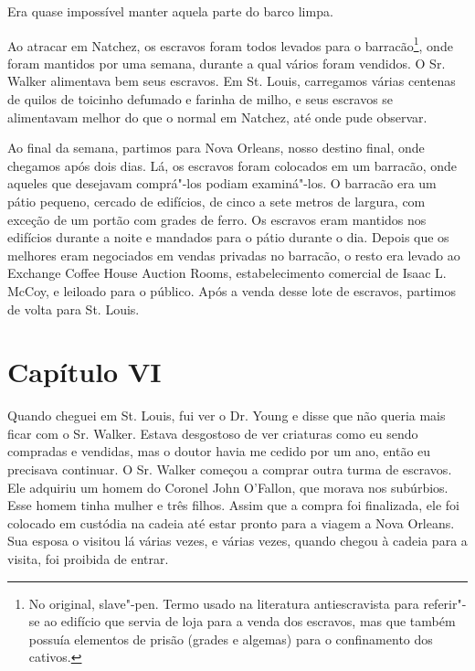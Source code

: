 Era quase impossível manter aquela parte do barco limpa.

Ao atracar em Natchez, os escravos foram todos levados para o
barracão\footnote{No original, slave"-pen. Termo usado na literatura
  antiescravista para referir"-se ao edifício que servia de loja para a
  venda dos escravos, mas que também possuía elementos de prisão (grades
  e algemas) para o confinamento dos cativos.}, onde foram mantidos por
uma semana, durante a qual vários foram vendidos. O Sr. Walker
alimentava bem seus escravos. Em St. Louis, carregamos várias centenas
de quilos de toicinho defumado e farinha de milho, e seus escravos se
alimentavam melhor do que o normal em Natchez, até onde pude observar.

Ao final da semana, partimos para Nova Orleans, nosso destino final,
onde chegamos após dois dias. Lá, os escravos foram colocados em um
barracão, onde aqueles que desejavam comprá"-los podiam examiná"-los. O
barracão era um pátio pequeno, cercado de edifícios, de cinco a sete
metros de largura, com exceção de um portão com grades de ferro. Os
escravos eram mantidos nos edifícios durante a noite e mandados para o
pátio durante o dia. Depois que os melhores eram negociados em vendas
privadas no barracão, o resto era levado ao Exchange Coffee House
Auction Rooms, estabelecimento comercial de Isaac L. McCoy, e leiloado
para o público. Após a venda desse lote de escravos, partimos de volta
para St. Louis.

\chapter{Capítulo VI}

Quando cheguei em St. Louis, fui ver o Dr. Young e disse que não queria
mais ficar com o Sr. Walker. Estava desgostoso de ver criaturas como eu
sendo compradas e vendidas, mas o doutor havia me cedido por um ano,
então eu precisava continuar. O Sr. Walker começou a comprar outra turma
de escravos. Ele adquiriu um homem do Coronel John O'Fallon, que morava
nos subúrbios. Esse homem tinha mulher e três filhos. Assim que a compra
foi finalizada, ele foi colocado em custódia na cadeia até estar pronto
para a viagem a Nova Orleans. Sua esposa o visitou lá várias vezes, e
várias vezes, quando chegou à cadeia para a visita, foi proibida de
entrar.

